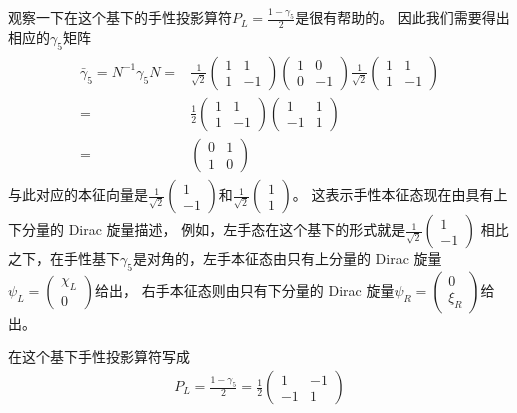 观察一下在这个基下的手性投影算符$P_L=\frac{1-\gamma_5}{2}$是很有帮助的。
因此我们需要得出相应的$\gamma_5$矩阵
\begin{align}
\begin{split}
  \bar{\gamma}_5=N^{-1}\gamma_5N=&\frac{1}{\sqrt{2}}\begin{pmatrix}1&1\\1&-1\end{pmatrix}\begin{pmatrix}1&0\\0&-1\end{pmatrix}
  \frac{1}{\sqrt{2}}\begin{pmatrix}1&1\\1&-1\end{pmatrix}\\
  =&\frac{1}{2}\begin{pmatrix}1&1\\1&-1\end{pmatrix}\begin{pmatrix}1&1\\-1&1\end{pmatrix}\\
  =&\begin{pmatrix}0&1\\1&0\end{pmatrix}
\end{split}
\end{align}
与此对应的本征向量是$\frac{1}{\sqrt{2}}\begin{pmatrix}1\\-1\end{pmatrix}$和$\frac{1}{\sqrt{2}}\begin{pmatrix}1\\1\end{pmatrix}$。
这表示手性本征态现在由具有上下分量的 Dirac 旋量描述，
例如，左手态在这个基下的形式就是$\frac{1}{\sqrt{2}}\begin{pmatrix}1\\-1\end{pmatrix}$
相比之下，在手性基下$\gamma_5$是对角的，左手本征态由只有上分量的 Dirac 旋量$\psi_L=\begin{pmatrix}\chi_L\\0\end{pmatrix}$给出，
右手本征态则由只有下分量的 Dirac 旋量$\psi_R=\begin{pmatrix}0\\\xi_R\end{pmatrix}$给出。

在这个基下手性投影算符写成
\begin{align}
  P_L=\frac{1-\gamma_5}{2}=\frac{1}{2}\begin{pmatrix}1&-1\\-1&1\end{pmatrix}
\end{align}

